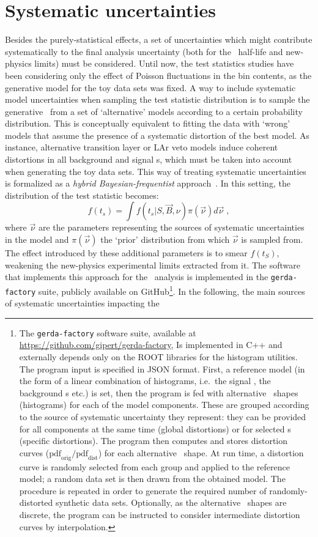 \section{Systematic uncertainties}%
\label{sec:2nbb-ana:systematics}

Besides the purely-statistical effects, a set of uncertainties which might contribute
systematically to the final analysis uncertainty (both for the \nnbb\ half-life and
new-physics limits) must be considered. Until now, the test statistics studies have been
considering only the effect of Poisson fluctuations in the bin contents, as the generative
model for the toy data sets was fixed. A way to include systematic model uncertainties
when sampling the test statistic distribution is to sample the generative \pdf\ from a set
of `alternative' models according to a certain probability distribution. This is
conceptually equivalent to fitting the data with `wrong' models that assume the presence
of a systematic distortion of the best model. As instance, alternative transition layer
or LAr veto models induce coherent distortions in all background and signal \pdf{}s, which
must be taken into account when generating the toy data sets.
\newpar
This way of treating systematic uncertainties is formalized as a \emph{hybrid
Bayesian-frequentist} approach~\cite{Zyla2020}. In this setting, the distribution
of the test statistic becomes:
\[
  f(t_s) = \int f(t_s | S, \vec{B}, \nu) \pi(\vec{\nu}) d\vec{\nu} \;,
\]
where $\vec{\nu}$ are the parameters representing the sources of systematic uncertainties
in the model and $\pi(\vec{\nu})$ the `prior' distribution from which $\vec{\nu}$ is
sampled from. The effect introduced by these additional parameters is to smear $f(t_S)$,
weakening the new-physics experimental limits extracted from it. The software that
implements this approach for the \nnbb\ analysis is implemented in the
\texttt{gerda-factory} suite, publicly available on GitHub\footnote{%
  The \texttt{gerda-factory} software suite, available at
  \url{https://github.com/gipert/gerda-factory}, Is implemented in C++ and externally
  depends only on the ROOT libraries for the histogram utilities. The program input is
  specified in JSON format. First, a reference model (in the form of a linear combination
  of histograms, i.e.~the signal \pdf, the background \pdf{}s etc.) is set, then the program
  is fed with alternative \pdf\ shapes (histograms) for each of the model components. These
  are grouped according to the source of systematic uncertainty they represent: they can
  be provided for all components at the same time (global distortions) or for selected
  \pdf{}s (specific distortions). The program then computes and stores distortion curves
  ($\text{pdf}_\text{orig}/\text{pdf}_\text{dist}$) for each alternative \pdf\ shape. At run
  time, a distortion curve is randomly selected from each group and applied to the
  reference model; a random data set is then drawn from the obtained model. The procedure
  is repeated in order to generate the required number of randomly-distorted synthetic
  data sets. Optionally, as the alternative \pdf\ shapes are discrete, the program can be
  instructed to consider intermediate distortion curves by interpolation.
}. In the following, the main sources of systematic uncertainties impacting the \nnbb\
